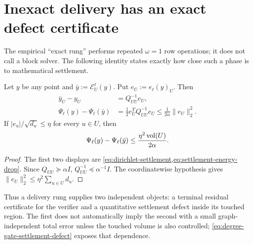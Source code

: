 \section{Inexact delivery has an exact defect certificate}
\label{sec:inexact}

The empirical ``exact rung'' performs repeated $\omega=1$ row operations; it
does not call a block solver.  The following identity states exactly how
close such a phase is to mathematical settlement.

\begin{theorem}
\label{thm:inexact-settlement}
Let $y$ be any point and $\bar y:=\mathcal E_U^\ell(y)$.  Put
$e_U:=e_\ell(y)_U$.  Then
\begin{align}
 \bar y_U-y_U&=Q_{UU}^{-1}e_U,
 \label{eq:inexact-point-defect}\\
 \Psi_\ell(y)-\Psi_\ell(\bar y)
 &=\frac12e_U^TQ_{UU}^{-1}e_U
 \leq\frac1{2\alpha}\|e_U\|_2^2.
 \label{eq:inexact-objective-defect}
\end{align}
If
$|e_u|/\sqrt{d_u}\leq\eta$ for every $u\in U$, then
\begin{equation}
 \Psi_\ell(y)-\Psi_\ell(\bar y)
 \leq\frac{\eta^2\operatorname{vol}(U)}{2\alpha}.
 \label{eq:degree-gate-settlement-defect}
\end{equation}
\end{theorem}

\begin{proof}
The first two displays are
\cref{eq:dirichlet-settlement,eq:settlement-energy-drop}.  Since
$Q_{UU}\succeq\alpha I$,
$Q_{UU}^{-1}\preceq\alpha^{-1}I$.  The coordinatewise hypothesis gives
$\|e_U\|_2^2\leq\eta^2\sum_{u\in U}d_u$.
\end{proof}

Thus a delivery rung supplies two independent objects: a terminal residual
certificate for the verifier and a quantitative settlement defect inside its
touched region.  The first does not automatically imply the second with a
small graph-independent total error unless the touched volume is also
controlled; \cref{eq:degree-gate-settlement-defect} exposes that dependence.
